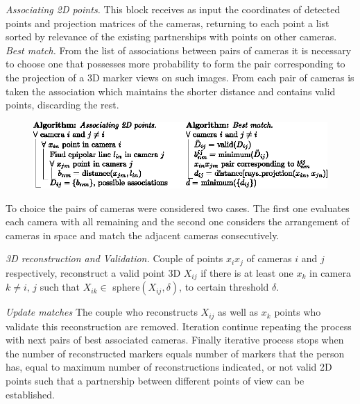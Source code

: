 \textit{Associating 2D points.}\label{seccion_asociar2D_uno}
%
This block receives as input the coordinates of detected points and projection matrices of the cameras, returning to each point a list sorted by relevance of the existing partnerships with points on other cameras. \\ 
\textit{\hspace*{0.5cm}Best match.}\label{MejorAsociacion}
%
From the list of associations between pairs of cameras it is necessary to choose one that possesses more probability to form the pair corresponding to the projection of a 3D marker views on such images.
%
From each pair of cameras is taken the association which maintains the shorter distance and contains valid points, discarding the rest. 
\vspace{-0.65cm}
\begin{figure}
    \begin{center}
       \includegraphics[scale=1.0]{./imagenes/Reconstruccion/Algoritmo_reconstruccion}       
    \end{center}
\end{figure}
\vspace{-1.0cm}

To choice the pairs of cameras were considered two cases.
The first one evaluates each camera with all remaining and the second one considers the arrangement of cameras in space and match the adjacent cameras consecutively.

\textit{3D reconstruction and Validation.}\label{seccion_reconstruccion3D_validacion}
Couple of points $x_i x_j$ of cameras $i$ and $j$ respectively, reconstruct a valid point 3D $X_{ij}$ if there is at least one $x_k$ in camera $k\not= i, \,j$ such that $X_{ik} \in $ sphere$(X_{ij}, \delta)$, to certain threshold $\delta$.

\textit{Update matches}\label{actualizar_asociaciones}
The couple who reconstructs $X_{ij}$ as well as $x_k$ points who validate this reconstruction are removed. 
Iteration continue repeating the process with next pairs of best associated cameras.
Finally iterative process stops when the number of reconstructed markers equals number of markers that the person has, equal to maximum number of reconstructions indicated, or not valid 2D points such that a partnership between different points of view can be established.
